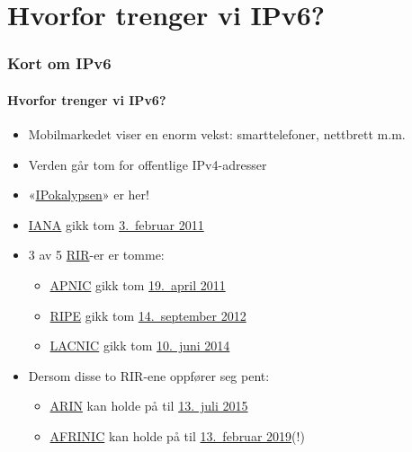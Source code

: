\section{Hvorfor trenger vi IPv6?}
\begin{frame}%
  \frametitle{Kort om IPv6}
  \framesubtitle{Hvorfor trenger vi IPv6?}
  \pause
  \begin{itemize}[<+->]
  \item Mobilmarkedet viser en enorm vekst: smarttelefoner, nettbrett m.m.
  \item Verden går tom for offentlige IPv4-adresser
  \item
    «\href{http://www.potaroo.net/presentations/2012-05-22-terena.pdf}{IPokalypsen}»
    er her!
  \item \href{http://www.iana.org/}{IANA} gikk tom
    \href{http://www.icann.org/en/news/press/releases/release-03feb11-en.pdf}{3.~februar
      2011}
  \item 3 av 5
    \href{http://en.wikipedia.org/wiki/Regional_Internet_registry}{RIR}-er
    er tomme:
    \begin{itemize}[<+->]
    \item \href{http://www.apnic.net/}{APNIC} gikk tom
      \href{http://www.apnic.net/community/ipv4-exhaustion/graphical-information}{19.~april
        2011}
    \item \href{http://www.ripe.net/}{RIPE} gikk tom
      \href{http://www.ripe.net/internet-coordination/ipv4-exhaustion}{14.~september
        2012}
    \item \href{http://www.lacnic.net/en/web/lacnic/inicio}{LACNIC}
      gikk tom
      \href{http://www.lacnic.net/en/web/lacnic/agotamiento-ipv4}{10.~juni
        2014}
    \end{itemize}
  \item Dersom disse to RIR-ene oppfører seg pent:
    \begin{itemize}
    \item \href{https://www.arin.net/}{ARIN} kan holde på til
      \href{http://www.potaroo.net/tools/ipv4/}{13.\ juli 2015}
    \item \href{http://www.afrinic.net/}{AFRINIC} kan holde på til
      \href{http://www.potaroo.net/tools/ipv4/}{13.\ februar 2019}(!)
    \end{itemize}
  \end{itemize}
\end{frame}

